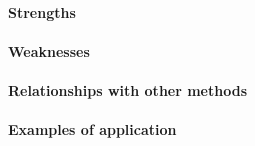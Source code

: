 \paragraph{Strengths}
\paragraph{Weaknesses}
\paragraph{Relationships with other methods}
\paragraph{Examples of application}



